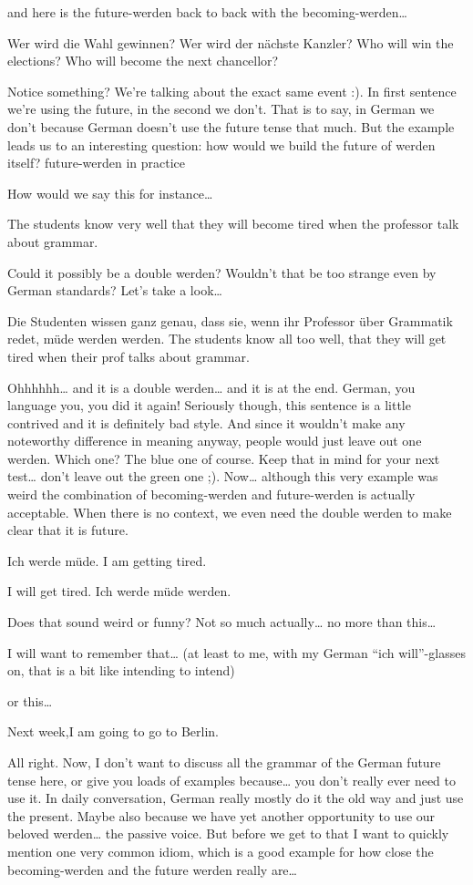 \documentclass[a4paper,12pt]{article}
\begin{document}
\begin{adjustwidth}{2em}{0pt}
\begin{adjustwidth}{3em}{0pt}
and here is the future-werden back to back with the becoming-werden…

    Wer wird die Wahl gewinnen? Wer wird der nächste Kanzler?
    Who will win the elections? Who will become the next chancellor?

Notice something? We’re talking about the exact same event :). In first sentence we’re using the future, in the second we don’t. That is to say, in German we don’t because German doesn’t use the future tense that much.
But the example leads us to an interesting question: how would we build the future of werden itself?
future-werden in practice

How would we say this for instance…

    The students know very well that they will become tired when the professor talk about grammar.

Could it possibly be a double werden? Wouldn’t that be too strange even by German standards? Let’s take a look…

    Die Studenten wissen ganz genau, dass sie, wenn ihr Professor über Grammatik redet, müde werden werden.
    The students know all too well, that they will get tired when their prof talks about grammar.

Ohhhhhh… and it is a double werden… and it is at the end. German, you language you, you did it again!
Seriously though, this sentence is a little contrived and it is definitely bad style. And since it wouldn’t make any noteworthy difference in meaning anyway, people would just leave out one werden. Which one? The blue one of course. Keep that in mind for your next test… don’t leave out the green one ;).
Now… although this very example was weird the combination of becoming-werden and future-werden is actually acceptable. When there is no context, we even need the double werden to make clear that it is future.

    Ich werde müde.
    I am getting tired.

    I will get tired.
    Ich werde müde werden.

Does that sound weird or funny? Not so much actually… no more than this…

    I will want to remember that…
    (at least to me, with my German “ich
    will”-glasses on, that is a bit like intending to intend)

or this…

    Next week,I am going to go to Berlin.

All right. Now, I don’t want to discuss all the grammar of the German future tense here, or give you loads of examples because… you don’t really ever need to use it. In daily conversation, German really mostly do it the old way and just use the present.
Maybe also because we have yet another opportunity to use our beloved werden… the passive voice. But before we get to that I want to quickly mention one very common idiom, which is a good example for how close the becoming-werden and the future werden really are…


\end{adjustwidth}
\end{adjustwidth}
\end{document}
